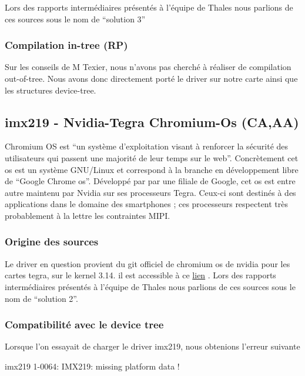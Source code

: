 {Lors des rapports intermédiaires présentés à l’équipe de Thales nous parlions de ces
sources sous le nom de “solution 3”

\subsubsection{Compilation in-tree (RP)}

Sur les conseils de M Texier, nous n’avons pas cherché à réaliser de compilation
out-of-tree. Nous avons donc directement porté le driver sur notre carte ainsi que les
structures device-tree.

\subsection{imx219 - Nvidia-Tegra Chromium-Os (CA,AA)}

Chromium OS est “un système d’exploitation visant à renforcer la sécurité des utilisateurs qui
passent une majorité de leur temps sur le web”. Concrètement cet os est un système GNU/Linux et
correspond à la branche en développement libre de “Google Chrome os”. Développé par par une filiale
de Google, cet os est entre autre maintenu par Nvidia sur ses processeurs Tegra. Ceux-ci
sont destinés à des applications dans le domaine des smartphones ; ces processeurs
respectent très probablement à la lettre les contraintes MIPI.

\subsubsection{Origine des sources}

Le driver en question provient du git officiel de chromium os de nvidia pour les cartes
tegra, sur le kernel 3.14. il est accessible à ce
\href{https://chromium.googlesource.com/chromiumos/third_party/kernel/+/factory-ryu-6486.14.B-chromeos-3.14/drivers/media/}{lien} .
Lors des rapports intermédiaires présentés à l’équipe de Thales nous parlions de ces
sources sous le nom de “solution 2”.

\subsubsection{Compatibilité avec le device tree}

Lorsque l’on essayait de charger le driver imx219, nous obtenions l’erreur suivante

\begin{tcolorbox}
    imx219 1-0064: IMX219: missing platform data !
\end{tcolorbox}

}
